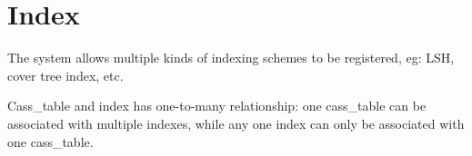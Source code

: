 %       
% 
% 
% 
\section{Index}

The system allows multiple kinds of indexing schemes to be
registered, eg: LSH, cover tree index, etc.

Cass\_table and index has one-to-many relationship:
one cass\_table can be associated with multiple indexes, while
any one index can only be associated with one cass\_table.

